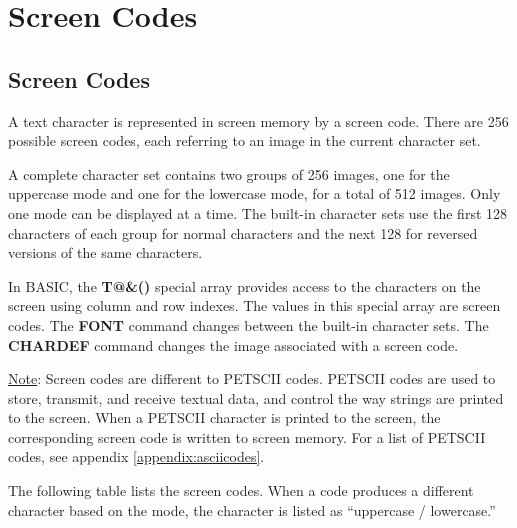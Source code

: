 \chapter{Screen Codes}

\section{Screen Codes}

\label{appendix:screencodes}

A text character is represented in screen memory by a screen code. There are
256 possible screen codes, each referring to an image in the current character
set.

A complete character set contains two groups of 256 images, one for the
uppercase mode and one for the lowercase mode, for a total of 512 images. Only
one mode can be displayed at a time. The built-in character sets use the first
128 characters of each group for normal characters and the next 128 for
reversed versions of the same characters.

In BASIC, the {\bf T@\&()} special array provides access to the characters on
the screen using column and row indexes. The values in this special array are
screen codes. The {\bf FONT} command changes between the built-in character
sets. The {\bf CHARDEF} command changes the image associated with a screen
code.

\underline{Note}: Screen codes are different to PETSCII codes. PETSCII codes
are used to store, transmit, and receive textual data, and control the way
strings are printed to the screen. When a PETSCII character is printed to the
screen, the corresponding screen code is written to screen memory. For a list
of PETSCII codes, see appendix \vref{appendix:asciicodes}.

The following table lists the screen codes. When a code produces a different
character based on the mode, the character is listed as ``uppercase /
lowercase.''

